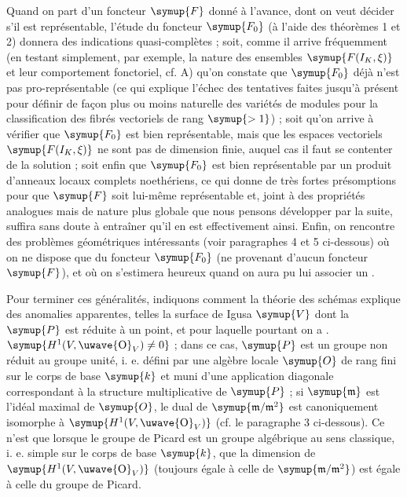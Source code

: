 Quand on part d'un foncteur $\symup{F}$ donné à l'avance, dont on veut décider s'il est
représentable, l'étude du foncteur $\symup{F_0}$ (à l'aide des théorèmes 1 et 2)
donnera des indications quasi-complètes ; soit, comme il arrive fréquemment
(en testant simplement, par exemple, la nature des ensembles
$\symup{F(I_K,\xi)}$ et leur comportement fonctoriel, cf. A) qu'on constate que
$\symup{F_0}$ déjà n'est pas pro-représentable (ce qui explique l'échec des tentatives
faites jusqu'à présent pour définir de façon plus ou moins naturelle des
variétés de modules pour la classification des fibrés vectoriels de rang
$\symup{>1}$) ; soit qu'on arrive à vérifier que $\symup{F_0}$ est bien représentable, mais
que les espaces vectoriels $\symup{F(I_K,\xi)}$ ne sont pas de dimension finie,
auquel cas il faut se contenter de la solution  ; soit enfin que
$\symup{F_0}$ est bien représentable par un produit d'anneaux locaux complets
noethériens, ce qui donne de très fortes présomptions pour que $\symup{F}$ soit
lui-même représentable et, joint à des propriétés analogues mais de nature
plus globale que nous pensons développer par la suite, suffira sans doute à
entraîner qu'il en est effectivement ainsi. Enfin, on rencontre des problèmes
géométriques intéressants (voir paragraphes 4 et 5 ci-dessous) où on ne dispose
que du foncteur $\symup{F_0}$ (ne provenant d'aucun foncteur  $\symup{F}$), et où on
s'estimera heureux quand on aura pu lui associer un .

Pour terminer ces généralités, indiquons comment la théorie des schémas
explique des anomalies apparentes, telles la surface de Igusa $\symup{V}$ dont la
 $\symup{P}$ est réduite à un point, et pour laquelle pourtant
on a . $\symup{H^1(V,\text{\uwave{O}}_V)\ne 0}$ ; dans ce cas, $\symup{P}$ est un groupe  non réduit au groupe
unité, i. e. défini par une algèbre locale $\symup{O}$ de rang fini sur le corps de base
$\symup{k}$ et muni d'une application diagonale correspondant à la structure
multiplicative de $\symup{P}$ ; si $\symup{\mathfrak m}$ est l'idéal maximal de $\symup{O}$, le dual
de $\symup{\mathfrak m/\mathfrak m^2}$ est canoniquement isomorphe à
$\symup{H^1(V,\text{\uwave{O}}_V)}$ (cf. le paragraphe 3 ci-dessous). Ce n'est que lorsque le
groupe de Picard est un groupe algébrique au sens classique, i. e. simple sur le
corps de base $\symup{k}$, que la dimension de $\symup{H^1(V,\text{\uwave{O}}_V)}$ (toujours égale à
celle de $\symup{\mathfrak m/\mathfrak m^2}$) est égale à celle du groupe de Picard.

